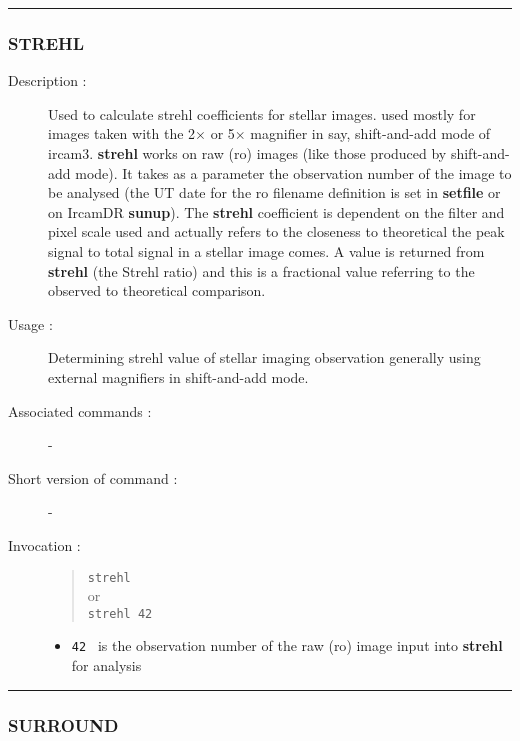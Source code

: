 \hrule
\subsubsection*{\label{STREHL}STREHL}

\begin{description}

\item[Description :] Used to calculate strehl coefficients for stellar
images.  used mostly for images taken with the 2$\times$ or 5$\times$
magnifier in say, shift-and-add mode of {\sc ircam3}.  {\bf strehl}
works on raw ({\sc ro}) images (like those produced by shift-and-add
mode).  It takes as a parameter the observation number of the image to
be analysed (the UT date for the {\sc ro} filename definition is set in
{\bf setfile} or on {\sc IrcamDR} {\bf sunup}).  The {\bf strehl}
coefficient is dependent on the filter and pixel scale used and
actually refers to the closeness to theoretical the peak signal to
total signal in a stellar image comes.  A value is returned from {\bf
strehl} (the Strehl ratio) and this is a fractional value referring to
the observed to theoretical comparison.

\item[Usage :] Determining strehl value of stellar imaging observation
generally using external magnifiers in shift-and-add mode.
\item[Associated commands :] -
\item[Short version of command :] -
\item[Invocation :]

\begin{quote}{\tt  strehl }\\
or \\
{\tt strehl 42 }
\end{quote}

\begin{itemize}

\item {\tt 42 } is the observation number of the raw ({\sc ro}) image input
 into {\bf strehl} for analysis
\end{itemize}

\end{description}

\hrule
\subsubsection*{\label{SURROUND}SURROUND}

